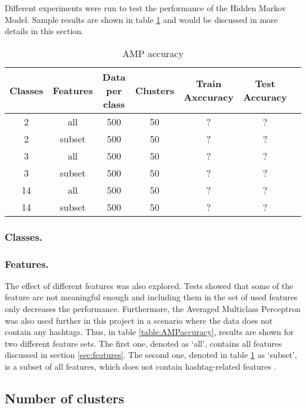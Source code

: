 
\begin{comment}
Experiments / Empirical evaluation (roughly 2-3 pages)
• Any details about experiments (dataset sizes, parameter selection, etc)
• Results
• Analysis (discussion of results / visualization / findings / etc)
\end{comment}




Different experiments were run to test the performance of the Hidden Markov Model. Sample results are shown in table \ref{table:HMMaccuracy} and would be discussed in more details in this section.


\begin{table}[h!]
\begin{center}
\begin{tabular}{| c | c | c | c | c | c | c |}
\hline
 {\textbf{Classes}} 			& {\textbf{Features}} 
 & {\textbf{Data per class}} 					& {\textbf{Clusters}} 
 & {\textbf{Train Axccuracy}} 					& {\textbf{Test Accuracy}} 
 \\
\hline
2 			& all 				& 500 		& 50			& ?			& ? 			\\
2 			& subset 		& 500 		& 50			& ?			& ? 			\\
3 			& all 				& 500 		& 50			& ?			& ? 			\\
3 			& subset 		& 500 		& 50			& ?			& ? 			\\
14 		& all		 		& 500 		& 50			& ?			& ? 			\\
14 		& subset 		& 500 		& 50			& ?			& ? 			\\
\hline
\end{tabular}
\caption{AMP accuracy}
\label{table:HMMaccuracy}
\end{center}
\end{table}


\subsubsection*{Classes.} 


\subsubsection*{Features.}


The effect of different features was also explored. Tests showed that some of the feature are not meaningful enough and including them in the set of used features only decreases the performance. Furthermore, the Averaged Multiclass Perceptron was also used further in this project in a scenario where the data does not contain any hashtags. Thus, in table \ref{table:AMPaccuracy}, results are shown for two different feature sets. The first one, denoted as `all', contains all features discussed in section \ref{sec:features}.
The second one, denoted in table \ref{table:HMMaccuracy} as `subset', is a subset of all features, which does not contain hashtag-related features .

\subsection*{Number of clusters}
